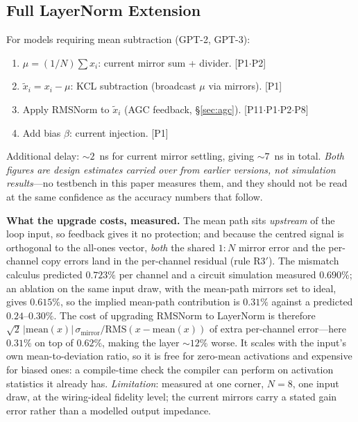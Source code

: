 \documentclass[11pt]{article}
\begin{document}
\subsection{Full LayerNorm Extension}

For models requiring mean subtraction (GPT-2, GPT-3):
\begin{enumerate}[leftmargin=*]
\item $\mu = (1/N)\sum x_i$: current mirror sum + divider. \hfill [P1$\cdot$P2]
\item $\tilde{x}_i = x_i - \mu$: KCL subtraction (broadcast $\mu$ via mirrors). \hfill [P1]
\item Apply RMSNorm to $\tilde{x}_i$ (AGC feedback, \S\ref{sec:agc}). \hfill [P11$\cdot$P1$\cdot$P2$\cdot$P8]
\item Add bias $\beta$: current injection. \hfill [P1]
\end{enumerate}

Additional delay: ${\sim}2$~ns for current mirror settling, giving ${\sim}7$~ns in total. \textit{Both figures are design estimates carried over from earlier versions, not simulation results}---no testbench in this paper measures them, and they should not be read at the same confidence as the accuracy numbers that follow.

\textbf{What the upgrade costs, measured.} The mean path sits \textit{upstream} of the loop input, so feedback gives it no protection; and because the centred signal is orthogonal to the all-ones vector, \textit{both} the shared $1{:}N$ mirror error and the per-channel copy errors land in the per-channel residual (rule R3$'$). The mismatch calculus predicted $0.723\%$ per channel and a circuit simulation measured $0.690\%$; an ablation on the same input draw, with the mean-path mirrors set to ideal, gives $0.615\%$, so the implied mean-path contribution is $\mathbf{0.31\%}$ against a predicted $0.24$--$0.30\%$. The cost of upgrading RMSNorm to LayerNorm is therefore $\sqrt2\,|\mathrm{mean}(x)|\,\sigma_{\mathrm{mirror}}/\mathrm{RMS}(x-\mathrm{mean}(x))$ of extra per-channel error---here $0.31\%$ on top of $0.62\%$, making the layer ${\sim}12\%$ worse. It scales with the input's own mean-to-deviation ratio, so it is free for zero-mean activations and expensive for biased ones: a compile-time check the compiler can perform on activation statistics it already has. \textit{Limitation}: measured at one corner, $N=8$, one input draw, at the wiring-ideal fidelity level; the current mirrors carry a stated gain error rather than a modelled output impedance.
\end{document}
